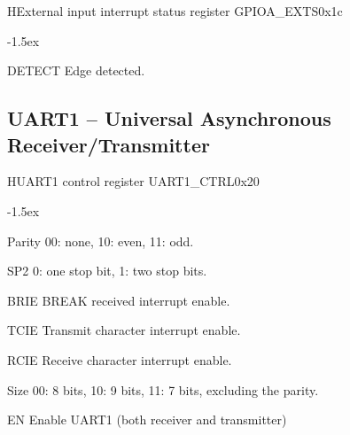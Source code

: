 \documentclass[12pt]{article}
\begin{document}
\begin{register}{H}{External input interrupt status register GPIOA\_EXTS}{0x1c}%
\label{exts}%
%
\regnewline%
\end{register}
\begin{regdesc}[0.7\textwidth]\begin{reglist}[000000]
\itemsep-1.5ex
\item[DETECT] Edge detected.
\end{reglist}\end{regdesc}

\subsection{UART1 -- Universal Asynchronous Receiver/Transmitter}

\begin{register}{H}{UART1 control register UART1\_CTRL}{0x20}
\label{uart1ctrl}
%
%
%
%
%
%
%
%
\regnewline%
\end{register}
\begin{regdesc}[0.7\textwidth]\begin{reglist}[00000]
\itemsep-1.5ex
\item[Parity] 00: none, 10: even, 11: odd.
\item[SP2] 0: one stop bit, 1: two stop bits.
\item[BRIE] BREAK received interrupt enable.
\item[TCIE] Transmit character interrupt enable.
\item[RCIE] Receive character interrupt enable.
\item[Size] 00: 8 bits, 10: 9 bits, 11: 7 bits, excluding the parity.
\item[EN] Enable UART1 (both receiver and transmitter)
\end{reglist}\end{regdesc}
\end{document}
